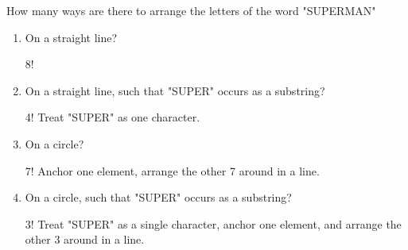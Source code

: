 \question How many ways are there to arrange the letters of the word "SUPERMAN"
\begin{enumerate}[label=(\alph*)]
 \item On a straight line? 
\begin{solution} [.3 cm] 8! \end{solution}

\item On a straight line, such that "SUPER" occurs as a substring?
\begin{solution} [.3 cm]  4! Treat "SUPER" as one character. \end{solution}

\item On a circle? 
\begin{solution} [.3 cm] 7! Anchor one element, arrange the other 7 around in a line.
 \end{solution}

\item On a circle, such that "SUPER" occurs as a substring?
\begin{solution} [.3 cm] 
3! Treat "SUPER" as a single character, anchor one element, and arrange the other 3 around in 
a line.  \end{solution}

\end{enumerate}